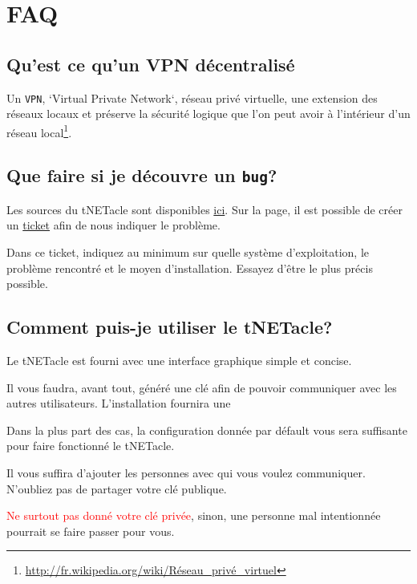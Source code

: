 \section{FAQ}
\subsection{Qu'est ce qu'un VPN décentralisé}
Un \texttt{VPN}, `Virtual Private Network`, réseau privé virtuelle,
une extension des réseaux locaux et préserve la sécurité logique que
l'on peut avoir à l'intérieur d'un réseau local\footnote{\url{http://fr.wikipedia.org/wiki/Réseau\_privé\_virtuel}}.

\subsection{Que faire si je découvre un \texttt{bug}?}

Les sources du tNETacle sont disponibles \href{https://github.com/LaKabane/tNETacle}{ici}.
Sur la page, il est possible de créer un \href{https://github.com/LaKabane/tNETacle/issues/new}{ticket}
afin de nous indiquer le problème.

Dans ce ticket, indiquez au minimum sur quelle système d'exploitation, le problème rencontré et le moyen d'installation.
Essayez d'être le plus précis possible.

\subsection{Comment puis-je utiliser le tNETacle?}
Le tNETacle est fourni avec une interface graphique simple et concise.

Il vous faudra, avant tout, généré une clé afin de pouvoir communiquer avec les autres utilisateurs.
L'installation fournira une 

Dans la plus part des cas,
la configuration donnée par défault vous sera suffisante pour faire fonctionné le tNETacle.

Il vous suffira d'ajouter les personnes avec qui vous voulez communiquer. N'oubliez pas de partager votre clé publique.

\textcolor{red}{Ne surtout pas donné votre clé privée}, sinon, une personne mal intentionnée pourrait se faire passer pour vous.
